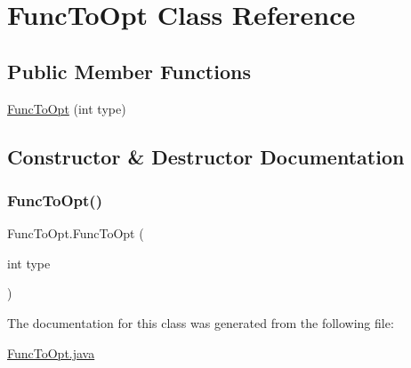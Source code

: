 \hypertarget{class_func_to_opt}{}\section{Func\+To\+Opt Class Reference}
\label{class_func_to_opt}
\subsection*{Public Member Functions}
\begin{DoxyCompactItemize}
\item 
\hyperlink{class_func_to_opt_a956a9009cd97109baf9374eb87bcbd6c}{Func\+To\+Opt} (int type)
\end{DoxyCompactItemize}


\subsection{Constructor \& Destructor Documentation}
\mbox{\label{class_func_to_opt_a956a9009cd97109baf9374eb87bcbd6c}} 
\subsubsection{\texorpdfstring{Func\+To\+Opt()}{FuncToOpt()}}
{\footnotesize\ttfamily Func\+To\+Opt.\+Func\+To\+Opt (\begin{DoxyParamCaption}\item[{int}]{type }\end{DoxyParamCaption})}



The documentation for this class was generated from the following file\+:\begin{DoxyCompactItemize}
\item 
\hyperlink{_func_to_opt_8java}{Func\+To\+Opt.\+java}\end{DoxyCompactItemize}
